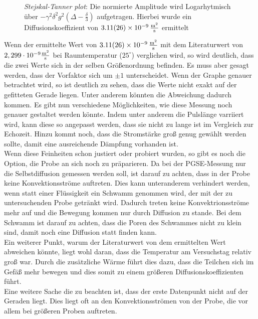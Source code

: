 \begin{figure}[H]
    \centering
    
    \caption[Bestimmung des selbst Diffusionskoeffizienten mithilfe von dem Stejskal-Tanner plot]{\textit{Stejskal-Tanner plot}: Die normierte Amplitude wird Logarhytmisch über $-\gamma^2\delta^2g^2\left(\Delta-\frac{\delta}{3}\right)$ aufgetragen. Hierbei wurde ein Diffusionskoeffizient von $\SI{3,11(26)e-9}{\frac{\m^2}{s}}$ ermittelt}
\end{figure}
 Wenn der ermittelte Wert von $\SI{3,11(26)e-9}{\frac{\m^2}{s}}$ mit dem Literaturwert von $2,299 \cdot 10^{-9}\si{\frac{\m^2}{\s}}$ bei Raumtemperatur ($25^{\circ}$) verglichen wird\cite{Diff}, so wird deutlich, dass die zwei Werte sich in der selben Größenordnung befinden. Es muss aber gesagt werden, dass der Vorfaktor sich um $\pm 1$ unterscheidet. Wenn der Graphe  genauer betrachtet wird, so ist deutlich zu sehen, dass die Werte nicht exakt auf der gefitteten Gerade liegen. Unter anderem könnten die Abweichung dadurch kommen. 
Es gibt nun verschiedene Möglichkeiten, wie diese Messung noch genauer gestaltet werden könnte. Indem unter anderem die Pulslänge varriiert wird, kann diese so angepasst werden, dass sie nicht zu lange ist im Vergleich zur Echozeit. Hinzu kommt noch, dass die Stromstärke groß genug gewählt werden sollte, damit eine ausreichende Dämpfung vorhanden ist.\\
Wenn diese Feinheiten schon justiert oder probiert wurden, so gibt es noch die Option, die Probe an sich noch zu präparieren. Da bei der PGSE-Messung nur die Selbstdiffusion gemessen werden soll, ist darauf zu achten, dass in der Probe keine Konvektionsströme auftreten. Dies kann unteranderem verhindert werden, wenn statt einer Flüssigkeit ein Schwamm genommen wird, der mit der zu untersuchenden Probe getränkt wird. Dadurch treten keine Konvektrionsströme mehr auf und die Bewegung kommen nur durch Diffusion zu stande. Bei dem Schwamm ist darauf zu achten, dass die Poren des Schwammes nicht zu klein sind, damit noch eine Diffusion statt finden kann.\\
Ein weiterer Punkt, warum der Literaturwert von dem ermittelten Wert abweichen könnte, liegt wohl daran, dass die Temperatur am Versuchstag relativ groß war. Durch die zusätzliche Wärme führt dies dazu, dass die Teilchen sich im Gefäß mehr bewegen und dies somit zu einem größeren Diffusionskoeffizienten führt.\\
Eine weitere Sache die zu beachten ist, dass der erste Datenpunkt nicht auf der Geraden liegt. Dies liegt oft an den Konvektionsströmen von der Probe, die vor allem bei größeren Proben auftreten.